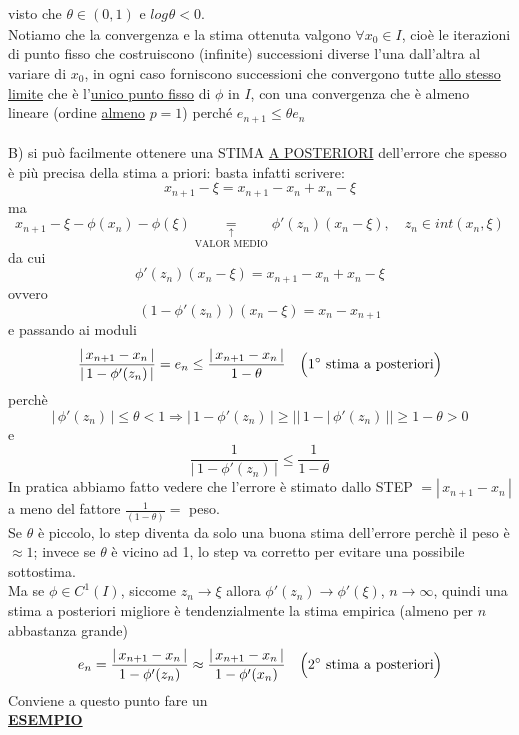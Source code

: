 \documentclass[12pt]{article}
\begin{document}
visto che $\theta \in (0,1)$ e $log_{}{\theta} < 0$.\\
Notiamo che la convergenza e la stima ottenuta valgono $\forall x_0 \in I$, cioè le iterazioni di punto fisso che costruiscono (infinite) successioni diverse l'una dall'altra al variare di $x_0$, in ogni caso forniscono successioni che convergono tutte \underline{allo stesso limite} che è l'\underline{unico punto fisso} di $\phi$ in $I$, con una convergenza che è almeno lineare (ordine \underline{almeno} $p=1$) perché $e_{n+1} \leq \theta e_n$\\\\
B) si può facilmente ottenere una STIMA \underline{A POSTERIORI} dell'errore che spesso è più precisa della stima a priori: basta infatti scrivere: 
\begin{equation*}
    x_{n+1} - \xi = x_{n+1} - x_n + x_n - \xi
\end{equation*}
ma \[x_{n+1}-\xi -\phi(x_n) - \phi(\xi) \underset{\text{VALOR  MEDIO}}{\underset{\uparrow}{=}} \phi'(z_n)(x_n - \xi), \quad z_n \in int(x_n,\xi) \]
da cui \[ \phi'(z_n)(x_n - \xi) = x_{n+1}-x_n+x_n-\xi \]
ovvero \[ (1-\phi'(z_n))(x_n - \xi) = x_n-x_{n+1} \]
e passando ai moduli
\[\frac{|\,x_{n+1}-x_n\,|}{|\,1-\phi'(z_n)\,|} = e_n \le \frac{|\,x_{n+1}-x_n\,|}{1-\theta} \quad \Bigl( 1^\circ \text{ stima a posteriori}\Bigr)\]
perchè 
\begin{equation*}
    |\,\phi'(z_n)\,| \le \theta < 1 \Longrightarrow |\,1-\phi'(z_n)\,| \ge ||\,1-|\,\phi'(z_n)\,|| \ge 1 - \theta > 0
\end{equation*}
     e 
\begin{equation*}
    \frac{1}{|\,1-\phi'(z_n)\,|} \le \frac{1}{1-\theta}
\end{equation*}
In pratica abbiamo fatto vedere che l'errore è stimato dallo STEP $= |\,x_{n+1}-x_n\,|$ a meno del fattore $\frac{1}{(1-\theta)}=$ peso.\\
Se $\theta$ è piccolo, lo step diventa da solo una buona stima dell'errore perchè il peso è $\approx 1$; invece se $\theta$ è vicino ad 1, lo step va corretto per evitare una possibile sottostima.\\
Ma se $\phi \in C^1(I)$, siccome $z_n \to \xi$ allora $\phi'(z_n) \to \phi'(\xi)$, $n \to \infty$, quindi una stima a posteriori migliore è tendenzialmente la stima empirica (almeno per $n$ abbastanza grande)
\[e_n = \frac{|\,x_{n+1}-x_n\,|}{1-\phi'(z_n)} \approx \frac{|\,x_{n+1}-x_n\,|}{1-\phi'(x_n)} \quad \Bigl( 2^\circ \text{ stima a posteriori}\Bigr)\]
Conviene a questo punto fare un\\ \textbf{\underline{ESEMPIO}}\\
\end{document}
